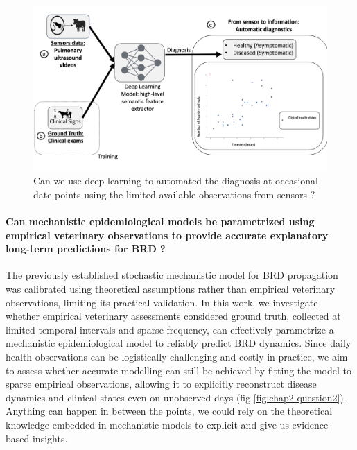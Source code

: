 \begin{figure}
  \includegraphics[width=\linewidth]{figures/chap2/chap1-question1.jpg}
  \caption{Can we use deep learning to automated the diagnosis at occasional date points using the limited available observations from sensors ?}
  \label{fig:chap2-question1}
\end{figure}
    
\paragraph{Can mechanistic epidemiological models be parametrized using empirical veterinary observations to provide accurate explanatory long-term predictions for BRD ?} The previously established stochastic mechanistic model for BRD propagation \cite{picault_modelling_2022} was calibrated using theoretical assumptions rather than empirical veterinary observations, limiting its practical validation. In this work, we investigate whether empirical veterinary assessments considered ground truth, collected at limited temporal intervals and sparse frequency, can effectively parametrize a mechanistic epidemiological model to reliably predict BRD dynamics. Since daily health observations can be logistically challenging and costly in practice, we aim to assess whether accurate modelling can still be achieved by fitting the model to sparse empirical observations, allowing it to explicitly reconstruct disease dynamics and clinical states even on unobserved days (fig \ref{fig:chap2-question2}). Anything can happen in between the points, we could rely on the theoretical knowledge embedded in mechanistic models to explicit and give us evidence-based insights.


